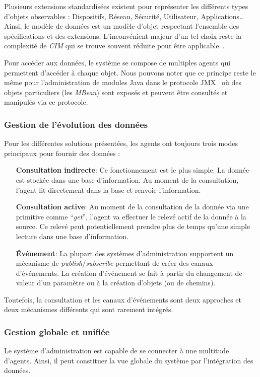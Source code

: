 Plusieurs extensions standardisées existent pour représenter les différents types d'objets observables : Dispositifs, Réseau, Sécurité, Utilisateur, Applications\dots{} Ainsi, le modèle de données est un modèle d'objet respectant l'ensemble des spécifications et des extensions. L'inconvénient majeur d'un tel choix reste la complexité de \textit{CIM} qui se trouve souvent réduite pour être applicable~\cite{Lopez:datacenter}.

Pour accéder aux données, le système se compose de multiples agents qui permettent d'accéder à chaque objet. Nous pouvons noter que ce principe reste le même pour l'administration de modules Java dans le protocole JMX~\cite{Sun:JMX} où des objets particuliers (les \textit{MBean}) sont exposés et peuvent être consultés et manipulés via ce protocole.

\subsubsection{Gestion de l'évolution des données}
Pour les différentes solutions présentées, les agents ont toujours trois modes principaux pour fournir des données :
\begin{itemize}
	\item[\textbf{Consultation indirecte}: ] Ce fonctionnement est le plus simple. La donnée est stockée dans une base d'information. Au moment de la consultation, l'agent lit directement dans la base et renvoie l'information.
	\item[\textbf{Consultation active}: ] Au moment de la consultation de la donnée via une primitive comme \enquote{\it get}, l'agent va effectuer le relevé actif de la donnée à la source. Ce relevé peut potentiellement prendre plus de temps qu'une simple lecture dans une base d'information.
	\item[\textbf{Événement}: ] La plupart des systèmes d'administration supportent un mécanisme de \textit{publish}/\textit{subscribe} permettant de créer des canaux d'événements. La création d'événement se fait à partir du changement de valeur d'un paramètre ou à la création d'objets (ou de chemins).
\end{itemize}

Toutefois, la consultation et les canaux d'événements sont deux approches et deux mécanismes différents qui sont rarement intégrés.

\subsubsection{Gestion globale et unifiée}
Le système d'administration est capable de se connecter à une multitude d'agents. Ainsi, il peut constituer la vue globale du système par l'intégration des données.

